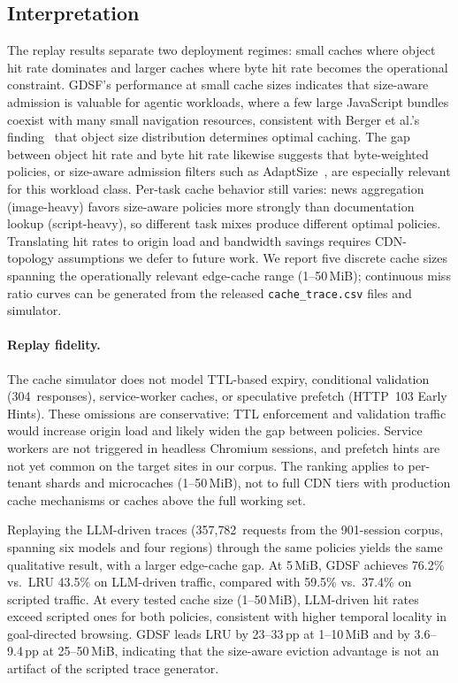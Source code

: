 \documentclass[10pt,sigconf,letterpaper,anonymous,nonacm]{acmart}
\begin{document}
\subsection{Interpretation}

The replay results separate two deployment regimes: small caches where
object hit rate dominates and larger caches where byte hit rate becomes
the operational constraint.  GDSF's performance at small cache sizes
indicates that size-aware admission is valuable for agentic workloads,
where a few large JavaScript bundles coexist with many small navigation
resources, consistent with Berger et al.'s finding~\cite{berger2018}
that object size distribution determines optimal caching.  The gap
between object hit rate and byte hit rate likewise suggests that
byte-weighted policies, or size-aware admission filters such as
AdaptSize~\cite{berger2017}, are especially relevant for this workload
class.  Per-task cache behavior still varies: news aggregation
(image-heavy) favors size-aware policies more strongly than
documentation lookup (script-heavy), so different task mixes produce
different optimal policies.
Translating hit rates to origin load and bandwidth savings requires CDN-topology assumptions we defer to future work.
We report five discrete cache sizes spanning the operationally relevant
edge-cache range (1--50\,MiB); continuous miss ratio curves can be
generated from the released \texttt{cache\_trace.csv} files and
simulator.

\paragraph{Replay fidelity.}
The cache simulator does not model TTL-based expiry, conditional
validation (304~responses), service-worker caches, or speculative
prefetch (HTTP~103 Early Hints).  These omissions are conservative:
TTL enforcement and validation traffic would increase origin load and
likely widen the gap between policies.  Service workers are not triggered in headless
Chromium sessions, and prefetch hints are not yet common on the target
sites in our corpus.  The ranking applies to per-tenant shards and
microcaches (1--50\,MiB), not to full CDN tiers with production cache
mechanisms or caches above the full working set.

Replaying the LLM-driven traces (357{,}782~requests from the
901-session corpus, spanning six models and four regions) through the
same policies yields the same qualitative result, with a larger
edge-cache gap.  At 5\,MiB, GDSF achieves 76.2\% vs.\ LRU 43.5\% on
LLM-driven traffic, compared with 59.5\% vs.\ 37.4\% on scripted
traffic.  At every tested cache size (1--50\,MiB), LLM-driven hit rates
exceed scripted ones for both policies, consistent with higher temporal
locality in goal-directed browsing.  GDSF leads LRU by 23--33\,pp at
1--10\,MiB and by 3.6--9.4\,pp at 25--50\,MiB, indicating that the
size-aware eviction advantage is not an artifact of the scripted trace
generator.
\end{document}
